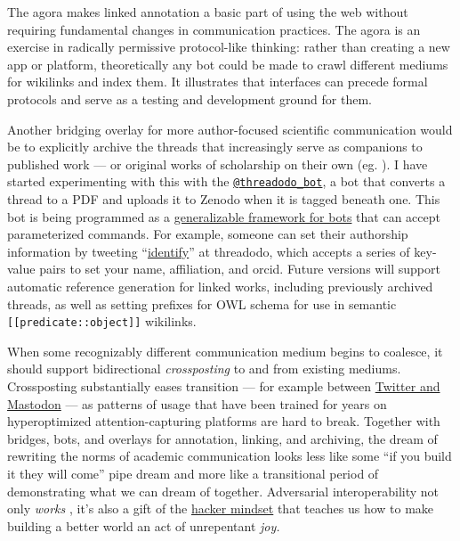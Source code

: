 The agora makes linked annotation a basic part of using the web without
requiring fundamental changes in communication practices. The agora is
an exercise in radically permissive protocol-like thinking: rather than
creating a new app or platform, theoretically any bot could be made to
crawl different mediums for wikilinks and index them. It illustrates
that interfaces can precede formal protocols and serve as a testing and
development ground for them.

Another bridging overlay for more author-focused scientific
communication would be to explicitly archive the threads that
increasingly serve as companions to published work --- or original works
of scholarship on their own (eg. \citep{bostonNeedKnowInformationSeeking2022} ). I have started experimenting
with this with the
\href{https://twitter.com/threadodo_bot}{\texttt{@threadodo\_bot}}, a
bot that converts a thread to a PDF and uploads it to Zenodo when it is tagged beneath one.
This bot is being programmed as a
\href{https://github.com/sneakers-the-rat/threadodo/blob/58d5f13f88728babdf2da0b34310c88349725566/threadodo/actions/commands.py\#L145-L168}{generalizable
framework for bots} that can accept parameterized commands. For example,
someone can set their authorship information by tweeting
``\href{https://twitter.com/json_dirs/status/1542305909983936512}{identify}''
at threadodo, which accepts a series of key-value pairs to set your
name, affiliation, and orcid. Future versions will support automatic
reference generation for linked works, including previously archived
threads, as well as setting prefixes for OWL schema for use in semantic
\texttt{{[}{[}predicate::object{]}{]}} wikilinks.

When some recognizably different communication medium begins to
coalesce, it should support bidirectional \emph{crossposting} to and
from existing mediums. Crossposting substantially eases transition ---
for example between
\href{https://crossposter.masto.donte.com.br/}{Twitter and Mastodon} ---
as patterns of usage that have been trained for years on hyperoptimized
attention-capturing platforms are hard to break. Together with bridges,
bots, and overlays for annotation, linking, and archiving, the dream of
rewriting the norms of academic communication looks less like some ``if
you build it they will come'' pipe dream and more like a transitional
period of demonstrating what we can dream of together. Adversarial
interoperability not only \emph{works} \citep{doctorowAdversarialInteroperability2019} , it's also a gift of the
\href{https://www.gwern.net/Unseeing}{hacker mindset} that teaches us
how to make building a better world an act of unrepentant \emph{joy.}

